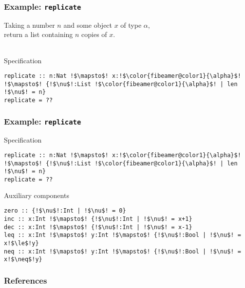 \documentclass{beamer}
\begin{document}
\begin{frame}[fragile]
	\frametitle{Example: \texttt{replicate}}

	Taking a number $n$ and some object $x$ of type $\alpha$,\\
	return a list containing $n$ copies of $x$.\\~\\

	\begin{exampleblock}{Specification}
		\vspace*{-.2\baselineskip}
		\begin{lstlisting}[escapechar=!,style=synquid]
replicate :: n:Nat !$\mapsto$! x:!$\color{fibeamer@color1}{\alpha}$! !$\mapsto$! {!$\nu$!:List !$\color{fibeamer@color1}{\alpha}$! | len !$\nu$! = n}
replicate = ??
		\end{lstlisting}
	\end{exampleblock}

\end{frame}

\begin{frame}[fragile]
	\frametitle{Example: \texttt{replicate}}

	\begin{exampleblock}{Specification}
		\vspace*{-.2\baselineskip}
		\begin{lstlisting}[escapechar=!,style=synquid]
replicate :: n:Nat !$\mapsto$! x:!$\color{fibeamer@color1}{\alpha}$! !$\mapsto$! {!$\nu$!:List !$\color{fibeamer@color1}{\alpha}$! | len !$\nu$! = n}
replicate = ??
		\end{lstlisting}
	\end{exampleblock}

	\begin{exampleblock}{Auxiliary components}
		\vspace*{-.2\baselineskip}
		\begin{lstlisting}[escapechar=!,style=synquid]
zero :: {!$\nu$!:Int | !$\nu$! = 0}
inc :: x:Int !$\mapsto$! {!$\nu$!:Int | !$\nu$! = x+1}
dec :: x:Int !$\mapsto$! {!$\nu$!:Int | !$\nu$! = x-1}
leq :: x:Int !$\mapsto$! y:Int !$\mapsto$! {!$\nu$!:Bool | !$\nu$! = x!$\le$!y}
neq :: x:Int !$\mapsto$! y:Int !$\mapsto$! {!$\nu$!:Bool | !$\nu$! = x!$\neq$!y}
		\end{lstlisting}
	\end{exampleblock}

\end{frame}

\begin{frame}[allowframebreaks]
  \frametitle{References}
  \printbibliography
 \end{frame}
\end{document}
